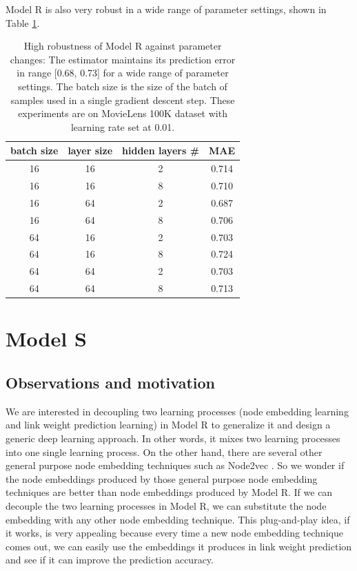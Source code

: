 \documentclass[12pt]{WSUThesis}
\theoremstyle{definition}
\begin{document}
Model R is also very robust in a wide range of parameter settings, shown in 
Table \ref{tab:robust}.
\begin{table}[!htb]
	\centering
	\caption{High robustness of Model R against parameter changes:
		The estimator maintains its prediction error in range [0.68, 0.73] for 
		a wide range of parameter settings. The batch size is the size of the 
		batch of samples used in a single gradient descent step.
		These experiments are on MovieLens 100K dataset with learning rate set 
		at 0.01.
	}
	\begin{tabular}{cccc}  \hline
		batch size & layer size & hidden layers \# & MAE \\ \hline
		16 & 16 & 2 & 0.714 \\ \hline
		16 & 16 & 8 & 0.710 \\ \hline
		16 & 64 & 2 & 0.687 \\ \hline
		16 & 64 & 8 & 0.706 \\ \hline
		64 & 16 & 2 & 0.703 \\ \hline
		64 & 16 & 8 & 0.724 \\ \hline
		64 & 64 & 2 & 0.703 \\ \hline
		64 & 64 & 8 & 0.713 \\ \hline
	\end{tabular}
	\label{tab:robust}
\end{table}


\chapter{Model S}

\section{Observations and motivation}
We are interested in decoupling two learning processes (node embedding learning and link weight prediction learning) in Model R to generalize it and design a generic deep learning approach.
In other words, it mixes two learning processes into one single learning process.
On the other hand, there are several other general purpose node embedding techniques such as Node2vec \citep{grover2016node2vec}.
So we wonder if the node embeddings produced by those general purpose node embedding techniques are better than node embeddings produced by Model R.
If we can decouple the two learning processes in Model R, we can substitute the node embedding with any other node embedding technique.
This plug-and-play idea, if it works, is very appealing because every time a new node embedding technique comes out, we can easily use the embeddings it produces in link weight prediction and see if it can improve the prediction accuracy.
\end{document}

